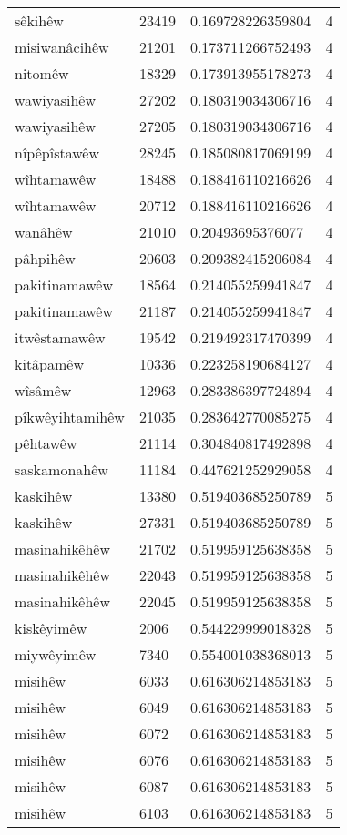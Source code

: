 \begin{longtable}{llll}
sêkihêw & 23419 & 0.169728226359804 & 4\\
misiwanâcihêw & 21201 & 0.173711266752493 & 4\\
nitomêw & 18329 & 0.173913955178273 & 4\\
wawiyasihêw & 27202 & 0.180319034306716 & 4\\
wawiyasihêw & 27205 & 0.180319034306716 & 4\\
nîpêpîstawêw & 28245 & 0.185080817069199 & 4\\
wîhtamawêw & 18488 & 0.188416110216626 & 4\\
wîhtamawêw & 20712 & 0.188416110216626 & 4\\
wanâhêw & 21010 & 0.20493695376077 & 4\\
pâhpihêw & 20603 & 0.209382415206084 & 4\\
pakitinamawêw & 18564 & 0.214055259941847 & 4\\
pakitinamawêw & 21187 & 0.214055259941847 & 4\\
itwêstamawêw & 19542 & 0.219492317470399 & 4\\
kitâpamêw & 10336 & 0.223258190684127 & 4\\
wîsâmêw & 12963 & 0.283386397724894 & 4\\
pîkwêyihtamihêw & 21035 & 0.283642770085275 & 4\\
pêhtawêw & 21114 & 0.304840817492898 & 4\\
saskamonahêw & 11184 & 0.447621252929058 & 4\\
kaskihêw & 13380 & 0.519403685250789 & 5\\
kaskihêw & 27331 & 0.519403685250789 & 5\\
masinahikêhêw & 21702 & 0.519959125638358 & 5\\
masinahikêhêw & 22043 & 0.519959125638358 & 5\\
masinahikêhêw & 22045 & 0.519959125638358 & 5\\
kiskêyimêw & 2006 & 0.544229999018328 & 5\\
miywêyimêw & 7340 & 0.554001038368013 & 5\\
misihêw & 6033 & 0.616306214853183 & 5\\
misihêw & 6049 & 0.616306214853183 & 5\\
misihêw & 6072 & 0.616306214853183 & 5\\
misihêw & 6076 & 0.616306214853183 & 5\\
misihêw & 6087 & 0.616306214853183 & 5\\
misihêw & 6103 & 0.616306214853183 & 5\\

\end{longtable}
